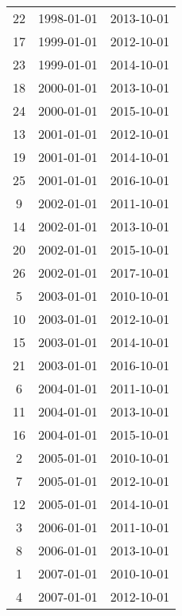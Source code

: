 % 
\begin{tabular}{ccc}
  \hline
  \hline
22 & 1998-01-01 & 2013-10-01 \\ 
  17 & 1999-01-01 & 2012-10-01 \\ 
  23 & 1999-01-01 & 2014-10-01 \\ 
  18 & 2000-01-01 & 2013-10-01 \\ 
  24 & 2000-01-01 & 2015-10-01 \\ 
  13 & 2001-01-01 & 2012-10-01 \\ 
  19 & 2001-01-01 & 2014-10-01 \\ 
  25 & 2001-01-01 & 2016-10-01 \\ 
  9 & 2002-01-01 & 2011-10-01 \\ 
  14 & 2002-01-01 & 2013-10-01 \\ 
  20 & 2002-01-01 & 2015-10-01 \\ 
  26 & 2002-01-01 & 2017-10-01 \\ 
  5 & 2003-01-01 & 2010-10-01 \\ 
  10 & 2003-01-01 & 2012-10-01 \\ 
  15 & 2003-01-01 & 2014-10-01 \\ 
  21 & 2003-01-01 & 2016-10-01 \\ 
  6 & 2004-01-01 & 2011-10-01 \\ 
  11 & 2004-01-01 & 2013-10-01 \\ 
  16 & 2004-01-01 & 2015-10-01 \\ 
  2 & 2005-01-01 & 2010-10-01 \\ 
  7 & 2005-01-01 & 2012-10-01 \\ 
  12 & 2005-01-01 & 2014-10-01 \\ 
  3 & 2006-01-01 & 2011-10-01 \\ 
  8 & 2006-01-01 & 2013-10-01 \\ 
  1 & 2007-01-01 & 2010-10-01 \\ 
  4 & 2007-01-01 & 2012-10-01 \\ 
   \hline
\end{tabular}
